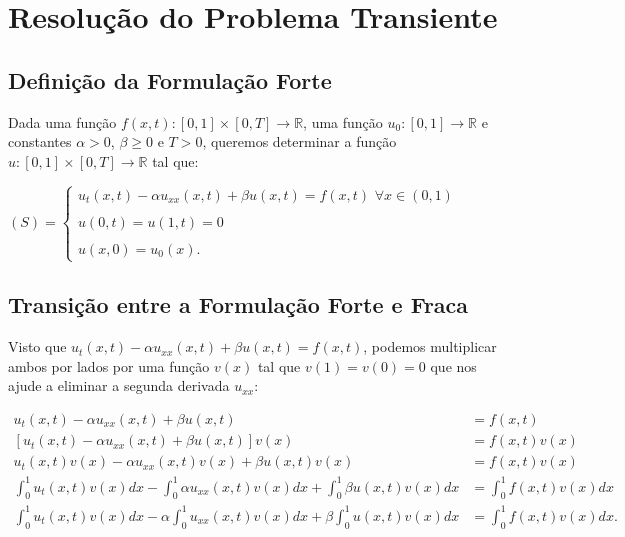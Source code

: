 
\chapter{Resolução do Problema Transiente}
\section{Definição da Formulação Forte}

  Dada uma função $f(x,t) : [0,1] \times [0,T] \to \mathbb{R}$, uma função $u_0 : [0,1] \to \mathbb{R}$ e constantes $\alpha > 0$, $\beta \geq 0$ e $T > 0$, queremos determinar a função $u : [0,1] \times [0,T] \to \mathbb{R}$ tal que:

  \begin{center}
    $(S) = \begin{cases}
      u_t(x,t) -\alpha u_{xx}(x,t) + \beta u(x,t) = f(x,t)\,\, \forall x \in (0, 1) \\ \\
      u(0,t) = u(1,t) = 0 \\ \\
      u(x,0) = u_0(x).
    \end{cases}$
  \end{center}

\section{Transição entre a Formulação Forte e Fraca}

  Visto que $u_t(x,t) -\alpha u_{xx}(x,t) + \beta u(x,t) = f(x,t)$, podemos multiplicar ambos por lados por uma função $v(x)$ tal que $v(1) = v(0) = 0$ que nos ajude a eliminar a segunda derivada $u_{xx}$:

  \begin{align*}
    u_t(x,t) -\alpha u_{xx}(x,t) + \beta u(x,t) &= f(x,t)  \\
    [u_t(x,t) -\alpha u_{xx}(x,t) + \beta u(x,t)]v(x) &= f(x,t)v(x)\\
    u_t(x,t)v(x) -\alpha u_{xx}(x,t)v(x) + \beta u(x,t)v(x) &= f(x,t)v(x)\\
    \int_{0}^{1} u_t(x,t)v(x) dx -\int_{0}^{1}\alpha u_{xx}(x,t)v(x) dx + \int_{0}^{1} \beta u(x,t)v(x) dx &= \int_{0}^{1}f(x,t)v(x) dx \\
    \int_{0}^{1} u_t(x,t)v(x) dx -\alpha \int_{0}^{1} u_{xx}(x,t)v(x) dx + \beta \int_{0}^{1} u(x,t)v(x) dx &= \int_{0}^{1}f(x,t)v(x) dx.
  \end{align*}

